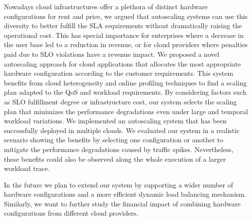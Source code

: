 
Nowadays cloud infrastructures offer a plethora of distinct hardware configurations for rent and price, we argued that autoscaling systems can use this diversity to better fulfill the SLA requirements without dramatically raising the operational cost. This has special importance for enterprises where a decrease in the user base led to a reduction in revenue, or for cloud providers where penalties paid due to SLO violations have a revenue impact. We proposed a novel autoscaling approach for cloud applications that allocates the most appropriate hardware configuration according to the customer requirements. This system benefits from cloud heterogeneity and online profiling techniques to find a scaling plan adapted to the QoS and workload requirements. By considering factors such as SLO fulfillment degree or infrastructure cost, our system selects the scaling plan that minimizes the performance degradations even under large and temporal workload variations. We implemented an autoscaling system that has been successfully deployed in multiple clouds. We evaluated our system in a realistic scenario showing the benefits by selecting one configuration or another to mitigate the performance degradations caused by traffic spikes. Nevertheless, these benefits could also be observed along the whole execution of a larger workload trace. 

In the future we plan to extend our system by supporting a wider number of hardware configurations and a more efficient dynamic load balancing mechanism. Similarly, we want to further study the financial impact of combining hardware configurations from different cloud providers.








